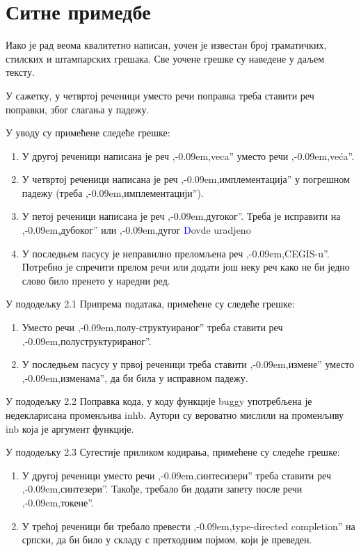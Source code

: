 \documentclass[a4paper]{report}
\newcommand{\odgovor}[1]{\textcolor{blue}{#1}}
\def\zn{,\kern-0.09em,}
\begin{document}
\section{Ситне примедбе}
\par Иако је рад веома квалитетно написан, уочен је известан број граматичких, стилских и штампарских грешака. Све уочене грешке су наведене у даљем тексту.

\par У сажетку, у четвртој реченици уместо речи поправка треба ставити реч поправки, због слагања у падежу.

\par У уводу су примећене следеће грешке:
\begin{enumerate}
\item У другој реченици написана је реч \zn veca'' уместо речи \zn veća''.
\item У четвртој реченици написана је реч \zn имплементација'' у погрешном падежу (треба \zn имплементацији'').
\
\item У петој реченици написана је реч \zn дугоког''. Треба је исправити на \zn дубоког'' или \zn дугог
\odgovor Dovde uradjeno

\item У последњем пасусу је неправилно преломљена реч \zn CEGIS-u''. Потребно је спречити прелом речи или додати још неку реч како не би једно слово било пренето у наредни ред.
\end{enumerate}

\par У пододељку 2.1 Припрема података, примећене су следеће грешке:
\begin{enumerate}
\item Уместо речи \zn полу-структуираног'' треба ставити реч \zn полуструктурираног''.
\item У последњем пасусу у првој реченици треба ставити \zn измене'' уместо \zn изменама'', да би била у исправном падежу.
\end{enumerate}

\par У пододељку 2.2 Поправка кода, у коду функције buggy употребљена је недекларисана променљива inhb. Аутори су вероватно мислили на променљиву inb која је аргумент функције.

\par У пододељку 2.3 Сугестије приликом кодирања, примећене су следеће грешке:
\begin{enumerate}
\item У другој реченици уместо речи \zn синтесизери'' треба ставити реч \zn синтезери''. Такође, требало би додати запету после речи \zn токене''.
\item У трећој реченици би требало превести \zn type-directed completion'' на српски, да би било у складу с претходним појмом, који је преведен.
\end{enumerate}
\end{document}
